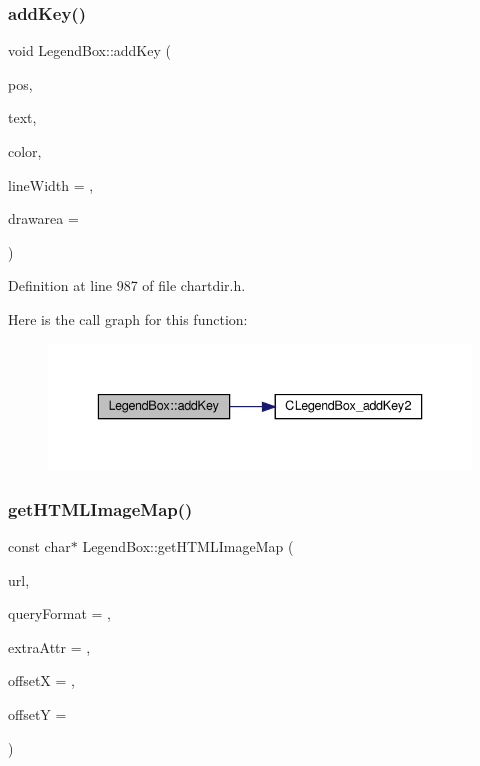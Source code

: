 \subsubsection{\texorpdfstring{add\+Key()}{addKey()}\hspace{0.1cm}{\footnotesize\ttfamily [2/2]}}
{\footnotesize\ttfamily void Legend\+Box\+::add\+Key (\begin{DoxyParamCaption}\item[{int}]{pos,  }\item[{const char $\ast$}]{text,  }\item[{int}]{color,  }\item[{int}]{line\+Width = {},  }\item[{const \hyperlink{class_draw_area}{Draw\+Area} $\ast$}]{drawarea = {} }\end{DoxyParamCaption})\hspace{0.3cm}{\ttfamily [inline]}}



Definition at line 987 of file chartdir.\+h.

Here is the call graph for this function\+:
\nopagebreak
\begin{figure}[H]
\begin{center}
\leavevmode
\includegraphics[width=336pt]{class_legend_box_a41e95938141756d0c9e4c2d6b15da6f0_cgraph}
\end{center}
\end{figure}
\mbox{\label{class_legend_box_ad1f44b3f7ccb3b59314d18c2ae2d0209}} 
\subsubsection{\texorpdfstring{get\+H\+T\+M\+L\+Image\+Map()}{getHTMLImageMap()}}
{\footnotesize\ttfamily const char$\ast$ Legend\+Box\+::get\+H\+T\+M\+L\+Image\+Map (\begin{DoxyParamCaption}\item[{const char $\ast$}]{url,  }\item[{const char $\ast$}]{query\+Format = {},  }\item[{const char $\ast$}]{extra\+Attr = {},  }\item[{int}]{offsetX = {},  }\item[{int}]{offsetY = {} }\end{DoxyParamCaption})\hspace{0.3cm}{\ttfamily [inline]}}



